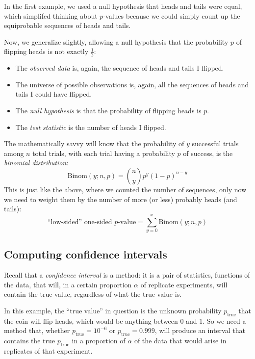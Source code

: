 In the first example, we used a null hypothesis that heads and tails were equal, which simplifed thinking about $p$-values because we could simply count up the equiprobable sequences of heads and tails.

Now, we generalize slightly, allowing a null hypothesis that the probability $p$ of flipping heads is not exactly $\tfrac{1}{2}$:
\begin{itemize}
\item The \emph{observed data} is, again, the sequence of heads and tails I flipped.
\item The universe of possible observations is, again, all the sequences of heads and tails I could have flipped.
\item The \emph{null hypothesis} is that the probability of flipping heads is $p$.
\item The \emph{test statistic} is the number of heads I flipped.
\end{itemize}

The mathematically savvy will know that the probability of $y$ successful trials among $n$ total trials, with each trial having a probability $p$ of success, is the \emph{binomial distribution}:
\begin{equation}
    \mathrm{Binom}(y; n, p) = \binom{n}{y} p^y (1-p)^{n-y}
\end{equation}
This is just like the above, where we counted the number of sequences, only now
we need to weight them by the number of more (or less) probably heads (and
tails):
\begin{equation}
    \text{``low-sided'' one-sided $p$-value} = \sum_{y=0}^x \mathrm{Binom}(y; n, p)
\end{equation}

\subsection{Computing confidence intervals}

Recall that a \emph{confidence interval} is a method: it is a pair of
statistics, functions of the data, that will, in a certain proportion $\alpha$
of replicate experiments, will contain the true value, regardless of what the
true value is.

In this example, the ``true value'' in question is the unknown probability
$p_\mathrm{true}$ that the coin will flip heads, which would be anything
between 0 and 1.  So we need a method that, whether $p_\mathrm{true} = 10^{-6}$
or $p_\mathrm{true} = 0.999$, will produce an interval that contains the true
$p_\mathrm{true}$ in a proportion of $\alpha$ of the data that would arise in
replicates of that experiment.

